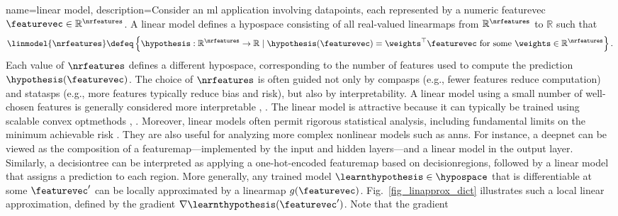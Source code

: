 {name={linear model}, 
	description={Consider an \gls{ml} application involving \glspl{datapoint}, each represented 
		by a numeric \gls{featurevec} $\featurevec \in \mathbb{R}^{\nrfeatures}$. A linear \gls{model} defines 
		a \gls{hypospace} consisting of all real-valued \glspl{linearmap} from $\mathbb{R}^{\nrfeatures}$ to $\mathbb{R}$ such that
		\begin{equation}
			\nonumber
			\label{equ_def_lin_model_hypspace_dict}
			\linmodel{\nrfeatures} \defeq \left\{ \hypothesis: \mathbb{R}^{\nrfeatures} \rightarrow \mathbb{R} \mid \hypothesis(\featurevec) = \weights^{\top} \featurevec \text{ for some } \weights \in \mathbb{R}^{\nrfeatures} \right\}.
		\end{equation}
		Each value of $\nrfeatures$ defines a different \gls{hypospace}, corresponding to the number of 
		\glspl{feature} used to compute the \gls{prediction} $\hypothesis(\featurevec)$. The choice of 
		$\nrfeatures$ is often guided not only by \glspl{compasp} (e.g., fewer \glspl{feature} reduce computation) and 
		\glspl{statasp} (e.g., more \glspl{feature} typically reduce \gls{bias} and \gls{risk}), but also by \gls{interpretability}. 
		A linear \gls{model} using a small number of well-chosen \glspl{feature} is generally considered 
		more interpretable \cite{rudin2019stop}, \cite{Ribeiro2016}.
		The linear \gls{model} is attractive because it can typically be trained using scalable \gls{convex} 
		\glspl{optmethod} \cite{BertsekasNonLinProgr}, \cite{hastie01statisticallearning}. 
		Moreover, linear \glspl{model} often permit rigorous 
		statistical analysis, including fundamental limits on the \gls{minimum} achievable \gls{risk} \cite{Wain2019}. 
		They are also useful for analyzing more complex nonlinear \glspl{model} such as \glspl{ann}. For instance, 
		a \gls{deepnet} can be viewed as the composition of a \gls{featuremap}—implemented by the input and 
		hidden \glspl{layer}—and a linear \gls{model} in the \gls{output} \gls{layer}. Similarly, a \gls{decisiontree} can be interpreted 
		as applying a one-hot-encoded \gls{featuremap} based on \glspl{decisionregion}, followed by a linear 
		\gls{model} that assigns a \gls{prediction} to each region.
		More generally, any trained \gls{model} $\learnthypothesis \in \hypospace$ that is 
		\gls{differentiable} at some $\featurevec'$ can be locally approximated by a \gls{linearmap} 
		$g(\featurevec)$. Fig.\ \ref{fig_linapprox_dict} illustrates such a local linear approximation, 
		defined by the \gls{gradient} $\nabla \learnthypothesis(\featurevec')$. Note that the \gls{gradient} 
}}
